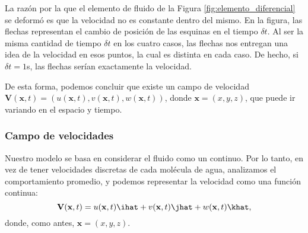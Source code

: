 La razón por la que el elemento de fluido de la Figura \ref{fig:elemento_diferencial} se deformó es que la velocidad no es constante dentro del mismo. 
En la figura, las flechas representan el cambio de posición de las esquinas en el tiempo $\delta t$. 
Al ser la misma cantidad de tiempo $\delta t$ en los cuatro casos, las flechas nos entregan una idea de la velocidad en esos puntos, la cual es distinta en cada caso.
De hecho, si $\delta t=1$s, las flechas serían exactamente la velocidad. 

De esta forma, podemos concluir que existe un campo de velocidad $\mathbf{V}(\mathbf{x},t) = (u(\mathbf{x},t),v(\mathbf{x},t),w(\mathbf{x},t))$, donde $\mathbf{x}=(x,y,z)$, que puede ir variando en el espacio y tiempo.

\subsubsection*{Campo de velocidades}
Nuestro modelo se basa en considerar el fluido como un continuo. 
Por lo tanto, en vez de tener velocidades discretas de cada molécula de agua, analizamos el comportamiento promedio, y podemos representar la velocidad como una función continua:
%
\begin{equation}
\mathbf{V}(\mathbf{x},t) = u(\mathbf{x},t)\ihat+v(\mathbf{x},t)\jhat+w(\mathbf{x},t)\khat,
\end{equation}
%
donde, como antes, $\mathbf{x} = (x,y,z)$. 

